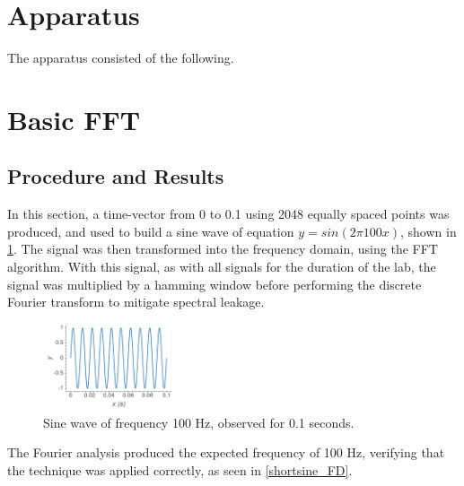 \documentclass[aps,prl,reprint]{revtex4-2}
\begin{document}
\section{Apparatus}

The apparatus consisted of the following.
\begin{itemize}
\end{itemize}

\section{Basic FFT}

\subsection{Procedure and Results}

In this section, a time-vector from 0 to 0.1 using 2048 equally spaced points
was produced, and used to build a sine wave of equation $y=sin(2\pi 100 x)$, 
shown in \ref{shortsine_TD}.
The signal was then transformed into the frequency domain, using the 
FFT algorithm. With this signal, as with all signals for the duration of the
lab, the signal was multiplied by a hamming window before performing the
discrete Fourier transform to mitigate spectral leakage. \\


\begin{figure}[h]
\includegraphics[width=0.34\textwidth]{../Images/l5_A_1a.png}
\caption{\label{shortsine_TD} Sine wave of frequency 100 Hz, observed for 0.1 seconds.}
\end{figure}

The Fourier analysis produced the expected frequency of 100 Hz, verifying that
the technique was applied correctly, as seen in \ref{shortsine_FD}. 
\end{document}
